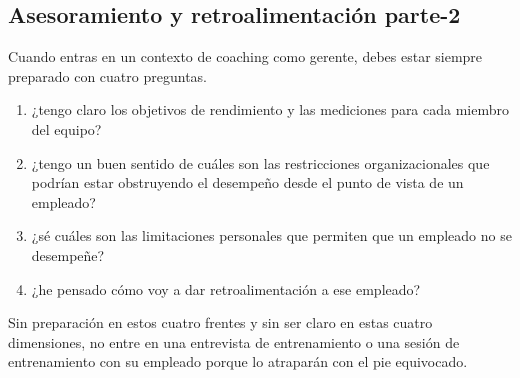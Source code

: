 \documentclass[10pt]{book}
\begin{document}
\subsection{Asesoramiento  y retroalimentación parte-2}
Cuando entras en un contexto de coaching como gerente, debes estar siempre preparado con cuatro preguntas. 
\begin{enumerate}[\bfseries 1.]
\item ¿tengo claro los objetivos de rendimiento y las mediciones para cada miembro del equipo?
\item ¿tengo un buen sentido de cuáles son las restricciones organizacionales que podrían estar obstruyendo el desempeño desde el punto de vista de un empleado?
\item ¿sé cuáles son las limitaciones personales que permiten que un empleado no se desempeñe?
\item ¿he pensado cómo voy a dar retroalimentación a ese empleado?
\end{enumerate}
Sin preparación en estos cuatro frentes y  sin ser claro en estas cuatro dimensiones,  no entre en una entrevista de entrenamiento o una sesión de entrenamiento con su empleado porque lo atraparán con el pie equivocado.
\end{document}
